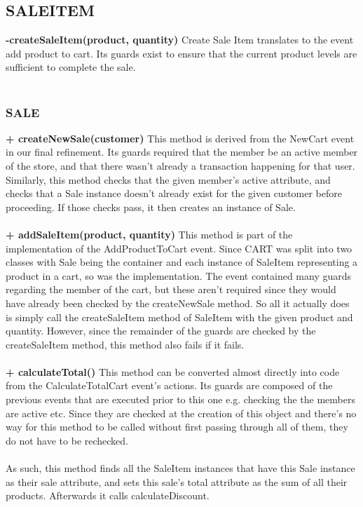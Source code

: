 \documentclass[a4paper]{article}
\begin{document}
\subsection{SALEITEM}
{\bf -createSaleItem(product, quantity)}
Create Sale Item translates to the event add product to cart. Its guards exist to ensure that the current product levels are sufficient to complete the sale.
\\\\
\subsubsection{SALE}
{\bf + createNewSale(customer)}
This method is derived from the NewCart event in our final refinement. Its guards required that the member be an active member of the store, and that there wasn’t already a transaction happening for that user. Similarly, this method checks that the given member’s active attribute, and checks that a Sale instance doesn’t already exist for the given customer before proceeding. If those checks pass, it then creates an instance of Sale.
\\\\
{\bf + addSaleItem(product, quantity)}
This method is part of the implementation of the AddProductToCart event. Since CART was split into two classes with Sale being the container and each instance of SaleItem representing a product in a cart, so was the implementation. The event contained many guards regarding the member of the cart, but these aren’t required since they would have already been checked by the createNewSale method. So all it actually does is simply call the createSaleItem method of SaleItem with the given product and quantity. However, since the remainder of the guards are checked by the createSaleItem method, this method also fails if it fails.
\\\\
{\bf + calculateTotal()}
This method can be converted almost directly into code from the CalculateTotalCart event’s actions. Its guards are composed of the previous events that are executed prior to this one e.g. checking the the members are active etc. Since they are checked at the creation of this object and there’s no way for this method to be called without first passing through all of them, they do not have to be rechecked.
\\\\
As such, this method finds all the SaleItem instances that have this Sale instance as their sale attribute, and sets this sale’s total attribute as the sum of all their products. Afterwards it calls calculateDiscount.
\end{document}
